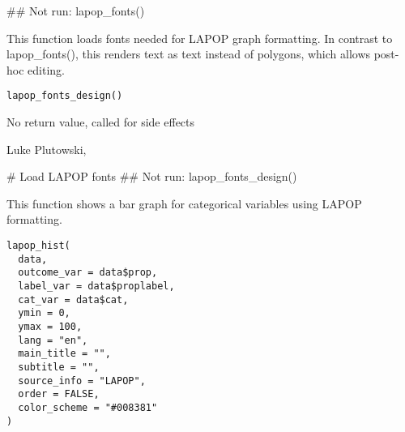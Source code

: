\documentclass[a4paper]{book}
\begin{document}
%
\begin{Examples}
\begin{ExampleCode}
## Not run: lapop_fonts()
\end{ExampleCode}
\end{Examples}
%
\begin{Description}
This function loads fonts needed for LAPOP graph formatting.  In contrast to lapop\_fonts(),
this renders text as text instead of polygons, which allows post-hoc editing.
\end{Description}
%
\begin{Usage}
\begin{verbatim}
lapop_fonts_design()
\end{verbatim}
\end{Usage}
%
\begin{Value}
No return value, called for side effects
\end{Value}
%
\begin{Author}
Luke Plutowski, 
\end{Author}
%
\begin{Examples}
\begin{ExampleCode}
# Load LAPOP fonts
## Not run: lapop_fonts_design()
\end{ExampleCode}
\end{Examples}
%
\begin{Description}
This function shows a bar graph for categorical variables using LAPOP formatting.
\end{Description}
%
\begin{Usage}
\begin{verbatim}
lapop_hist(
  data,
  outcome_var = data$prop,
  label_var = data$proplabel,
  cat_var = data$cat,
  ymin = 0,
  ymax = 100,
  lang = "en",
  main_title = "",
  subtitle = "",
  source_info = "LAPOP",
  order = FALSE,
  color_scheme = "#008381"
)
\end{verbatim}
\end{Usage}
%
\end{document}
